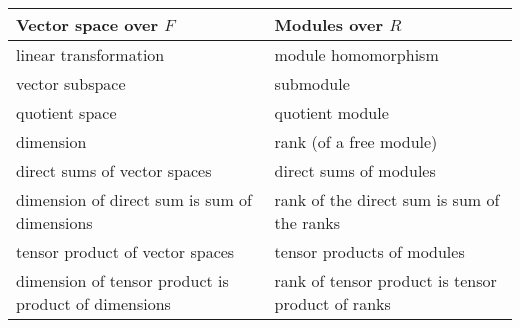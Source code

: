 \documentclass[12pt]{article}
\begin{document}
\begin{tabular}[h]{|l|l|}
  \hline
  Vector space over $F$ & Modules over $R$ \\ \hline \hline
  linear transformation & module homomorphism\\\hline
  vector subspace & submodule\\\hline
  quotient space & quotient module\\\hline
  dimension  & rank (of a free module) \\\hline
  direct sums of vector spaces & direct sums of modules\\\hline
  \begin{minipage}{0.4\linewidth}dimension of direct sum is sum of dimensions\end{minipage} & \begin{minipage}{0.4\linewidth}rank of the direct
                                                 sum is sum of the
                                                 ranks\end{minipage}\\\hline
  tensor product of vector spaces & tensor products of modules\\\hline
  \begin{minipage}{0.4\linewidth}dimension of tensor product is product of dimensions \end{minipage}& \begin{minipage}{0.4\linewidth}rank of
                                                         tensor
                                                         product is
                                                         tensor
                                                         product of
                                                         ranks\end{minipage}\\
\hline
\end{tabular}
\end{document}
